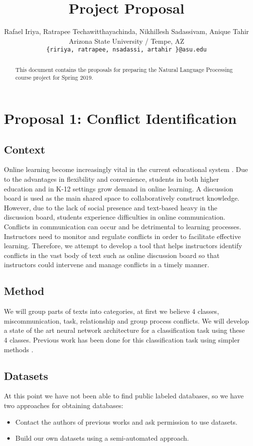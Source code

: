 \documentclass[11pt,a4paper]{article}
\title{Project Proposal}
\author{
  Rafael Iriya, Ratrapee Techawitthayachinda, Nikhillesh Sadassivam,
  Anique Tahir\\
  Arizona State University / Tempe, AZ \\
  \texttt{\{ririya, ratrapee, nsadassi, artahir \}@asu.edu} \\}
\date{}
\begin{document}
\maketitle
\begin{abstract}
  This document contains the proposals for preparing the Natural Language Processing course project for Spring 2019. 
\end{abstract}

\section{Proposal 1: Conflict Identification}

\subsection{Context}
Online learning become increasingly vital in the current educational system \cite{kim2009pedagogical}. Due to the advantages in flexibility and convenience, students in both higher education and in K-12 settings grow demand in online learning. A discussion board is used as the main shared space to collaboratively construct knowledge. However, due to the lack of social presence and text-based heavy in the discussion board, students experience difficulties in online communication. Conflicts in communication can occur and be detrimental to learning processes. Instructors need to monitor and regulate conflicts in order to facilitate effective learning. Therefore, we attempt  to develop a tool that helps instructors identify conflicts in the vast body of text such as online discussion board so that instructors could intervene and manage conflicts in a timely manner. 

\subsection{Method}
We will group parts of texts into categories, at first we believe 4 classes, miscommunication, task, relationship and group process conflicts. We will develop a state of the art neural network architecture for a classification task using these 4 classes. Previous work has been done for this classification task using simpler methods \cite{ravi2007profiling, rose2017artificial}. 



\subsection{Datasets}
 At this point we have not been able to find public labeled databases, so we have two approaches for obtaining databases:
 \begin{itemize}
     \item Contact the authors of previous works and ask permission to use datasets.
     \item Build our own datasets using a semi-automated approach.
 \end{itemize}  
\end{document}
